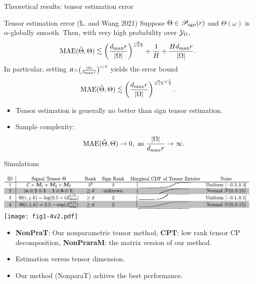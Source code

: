 \documentclass[10pt, mathserif]{beamer} %
\theoremstyle{definition}
\theoremstyle{plain}
\def\caliP{\mathscr{P}_{\textup{sgn}}}
\begin{document}
\begin{frame}{Theoretical results: tensor estimation error}
    \begin{block}{Tensor estimation error (L. and Wang 2021)}
    Suppose $\Theta\in\caliP(r)$ and  $\Theta(\omega)$ is $\alpha$-globally smooth. Then, with very high probability over $\mathcal{Y}_\Omega$, 
    \begin{equation}\label{eq:bound2}
\textup{MAE}(\hat \Theta, \Theta)\lesssim \left({d_{\max} r \over |\Omega|}\right)^{\alpha\over\alpha+2}+{1\over H}+{Hd_{\max} r \over |\Omega|}.
\end{equation}
In particular, setting $\scriptstyle H\asymp \left( |\Omega|\over d_{\max}r\right)^{1/2}$ yields the error bound
\begin{equation}\label{eq:real}
\textup{MAE}(\hat \Theta, \Theta)\lesssim \left(d_{\max}r \over |\Omega|\right)^{{\alpha \over \alpha+2} \vee {1\over 2}}.
\end{equation}
    \end{block}
    \begin{itemize}
        \item Tensor estimation is generally no better than sign tensor estimation.
        \item Sample complexity: \[\text{MAE}(\hat\Theta,\Theta)\rightarrow 0, \text{ as } {|\Omega|\over d_{\max}r}\rightarrow\infty.\]
    \end{itemize}
\end{frame}


\begin{frame}{Simulations}
    \begin{center}
    \includegraphics[width = \textwidth]{simulation.pdf}
    \texttt{[image: fig1-4v2.pdf]}
    \end{center}
    \begin{itemize}
    \item {\bf NonPraT}: Our nonparametric tensor method, {\bf CPT}: low rank tensor CP decomposition, {\bf NonPraraM}: the matrix version of our method.
    \item Estimation versus tensor dimension.
    \item Our method (NonparaT) achives the best performance.
    \end{itemize}
\end{frame}
\end{document}
